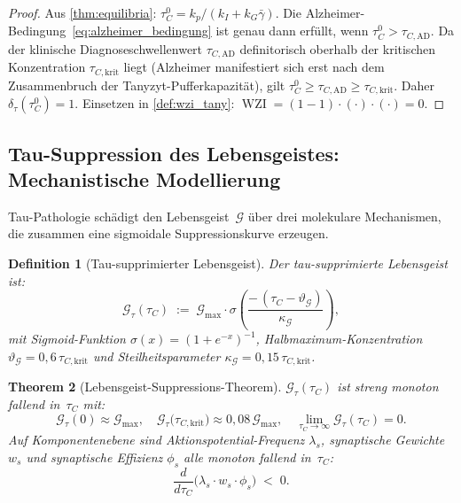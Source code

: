 ﻿\documentclass[12pt,a4paper]{article}
\newtheorem{theorem}{Theorem}[section]
\newtheorem{definition}[theorem]{Definition}
\theoremstyle{definition}
\DeclareMathOperator{\WZI}{WZI}
\begin{document}
	\begin{proof}
		Aus \cref{thm:equilibria}: $\tau_C^0 = k_p/(k_I + k_G\bar{\gamma})$.
		Die Alzheimer-Bedingung~\eqref{eq:alzheimer_bedingung} ist genau dann erfüllt,
		wenn $\tau_C^0 > \tau_{C,\mathrm{AD}}$.
		Da der klinische Diagnoseschwellenwert $\tau_{C,\mathrm{AD}}$ definitorisch
		oberhalb der kritischen Konzentration $\tau_{C,\mathrm{krit}}$ liegt (Alzheimer
		manifestiert sich erst nach dem Zusammenbruch der Tanyzyt-Pufferkapazität), gilt
		$\tau_C^0 \geq \tau_{C,\mathrm{AD}} \geq \tau_{C,\mathrm{krit}}$.
		Daher $\delta_\tau(\tau_C^0) = 1$.
		Einsetzen in \cref{def:wzi_tany}: $\WZI = (1 - 1) \cdot (\cdot) \cdot (\cdot) = 0$.
		
	\end{proof}

	\subsection{Tau-Suppression des Lebensgeistes: Mechanistische Modellierung}

	Tau-Pathologie schädigt den Lebensgeist~$\mathcal{G}$ über drei molekulare Mechanismen,
	die zusammen eine sigmoidale Suppressionskurve erzeugen.

	\begin{definition}[Tau-supprimierter Lebensgeist]
		\label{def:gtau}
		Der \emph{tau-supprimierte Lebensgeist} ist:
		\[
			\mathcal{G}_\tau(\tau_C)
			\;:=\; \mathcal{G}_{\max} \cdot
			\sigma\!\left(\frac{-\,(\tau_C - \vartheta_\mathcal{G})}{\kappa_\mathcal{G}}\right),
		\]
		mit Sigmoid-Funktion $\sigma(x) = (1+e^{-x})^{-1}$, Halbmaximum-Konzentration
		$\vartheta_\mathcal{G} = 0{,}6\,\tau_{C,\mathrm{krit}}$ und Steilheitsparameter
		$\kappa_\mathcal{G} = 0{,}15\,\tau_{C,\mathrm{krit}}$.
	\end{definition}

	\begin{theorem}[Lebensgeist-Suppressions-Theorem]
		\label{thm:gtau}
		$\mathcal{G}_\tau(\tau_C)$ ist streng monoton fallend in~$\tau_C$ mit:
		\[
			\mathcal{G}_\tau(0) \approx \mathcal{G}_{\max}, \quad
			\mathcal{G}_\tau\!\bigl(\tau_{C,\mathrm{krit}}\bigr) \approx 0{,}08\,\mathcal{G}_{\max},
			\quad
			\lim_{\tau_C \to \infty} \mathcal{G}_\tau(\tau_C) = 0.
		\]
		Auf Komponentenebene sind Aktionspotential-Frequenz $\lambda_s$, synaptische Gewichte
		$w_s$ und synaptische Effizienz $\phi_s$ alle monoton fallend in~$\tau_C$:
		\[
			\frac{d}{d\tau_C}\bigl(\lambda_s \cdot w_s \cdot \phi_s\bigr) \;<\; 0.
		\]
	\end{theorem}
\end{document}

